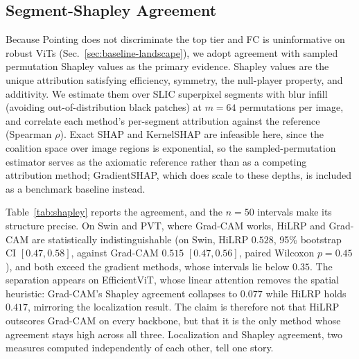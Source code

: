 \documentclass[lettersize,journal]{IEEEtran}
\theoremstyle{definition}
\theoremstyle{plain}
\begin{document}
\subsection{Segment-Shapley Agreement}
\label{sec:shapley}
Because Pointing does not discriminate the top tier and FC is uninformative on robust ViTs (Sec.~\ref{sec:baseline-landscape}), we adopt agreement with sampled permutation Shapley values as the primary evidence. Shapley values are the unique attribution satisfying efficiency, symmetry, the null-player property, and additivity. We estimate them over SLIC superpixel segments with blur infill (avoiding out-of-distribution black patches) at $m{=}64$ permutations per image, and correlate each method's per-segment attribution against the reference (Spearman $\rho$). Exact SHAP and KernelSHAP are infeasible here, since the coalition space over image regions is exponential, so the sampled-permutation estimator serves as the axiomatic reference rather than as a competing attribution method; GradientSHAP, which does scale to these depths, is included as a benchmark baseline instead.

Table~\ref{tab:shapley} reports the agreement, and the $n{=}50$ intervals make its structure precise. On Swin and PVT, where Grad-CAM works, HiLRP and Grad-CAM are statistically indistinguishable (on Swin, HiLRP $0.528$, 95\% bootstrap CI $[0.47,0.58]$, against Grad-CAM $0.515$ $[0.47,0.56]$, paired Wilcoxon $p=0.45$), and both exceed the gradient methods, whose intervals lie below $0.35$. The separation appears on EfficientViT, whose linear attention removes the spatial heuristic: Grad-CAM's Shapley agreement collapses to $0.077$ while HiLRP holds $0.417$, mirroring the localization result. The claim is therefore not that HiLRP outscores Grad-CAM on every backbone, but that it is the only method whose agreement stays high across all three. Localization and Shapley agreement, two measures computed independently of each other, tell one story.
\end{document}
